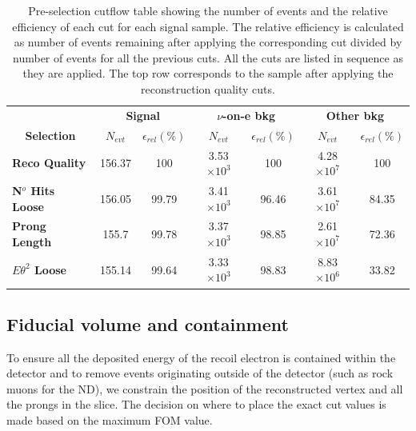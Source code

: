 
\begin{table}[!hb]
\centering
\caption[Event selection cutflow table for the pre-selection]{Pre-selection cutflow table showing the number of events and the relative efficiency of each cut for each signal sample. The relative efficiency is calculated as number of events remaining after applying the corresponding cut divided by number of events for all the previous cuts. All the cuts are listed in sequence as they are applied. The top row corresponds to the sample after applying the reconstruction quality cuts.}
\begin{tabular}{|l|cc|cc|cc|}\hline
\multicolumn{1}{|c|}{} & \multicolumn{2}{c|}{\textbf{Signal}} & \multicolumn{2}{c|}{\textbf{$\nu$-on-e bkg}} & \multicolumn{2}{c|}{\textbf{Other bkg}} \\
\multicolumn{1}{|c|}{\multirow{-2}{*}{\textbf{Selection}}} & \textbf{$N_{evt}$} & \textbf{$\epsilon_{rel}\left(\%\right)$} & \textbf{$N_{evt}$} & \textbf{$\epsilon_{rel}\left(\%\right)$}  & \textbf{$N_{evt}$} & \textbf{$\epsilon_{rel}\left(\%\right)$}\\\hline
\textbf{Reco Quality} & 156.37 & 100 & 3.53$\times 10^3$ & 100 & 4.28$\times 10^7$ & 100\\
\textbf{N$^o$ Hits Loose} & 156.05 & 99.79 & 3.41$\times 10^3$ & 96.46 & 3.61$\times 10^7$ & 84.35\\
\textbf{Prong Length} & 155.7 & 99.78 & 3.37$\times 10^3$ & 98.85 & 2.61$\times 10^7$ & 72.36\\
\textbf{$E\theta^2$ Loose} & 155.14 & 99.64 & 3.33$\times 10^3$ & 98.83 & 8.83$\times 10^6$ & 33.82\\\hline
\end{tabular}
\label{tab:CutflowTableBasicSelection}
\end{table}

\subsection{Fiducial volume and containment}\label{sec:NuMMEventSelFidCont}
To ensure all the deposited energy of the recoil electron is contained within the detector and to remove events originating outside of the detector (such as rock muons for the \gls{ND}), we constrain the position of the reconstructed vertex and all the prongs in the slice. The decision on where to place the exact cut values is made based on the maximum \gls{FOM} value.

